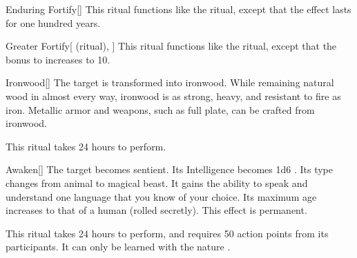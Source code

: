 \lowercase{\hypertarget{spell:Enduring Fortify}{}}\label{spell:Enduring Fortify}
\begin{apability}[\nth{3}]{\hypertarget{spell:Enduring Fortify}{Enduring Fortify}}[]
This ritual functions like the  ritual, except that the effect lasts for one hundred years.
\end{apability}
\vspace{0.25em}



\lowercase{\hypertarget{spell:Greater Fortify}{}}\label{spell:Greater Fortify}
\begin{attuneability}[\nth{3}]{\hypertarget{spell:Greater Fortify}{Greater Fortify}}[ (ritual), ]
This ritual functions like the  ritual, except that the bonus to  increases to 10.
\end{attuneability}
\vspace{0.25em}



\lowercase{\hypertarget{spell:Ironwood}{}}\label{spell:Ironwood}
\begin{apability}[\nth{3}]{\hypertarget{spell:Ironwood}{Ironwood}}[]
The target is transformed into ironwood.
While remaining natural wood in almost every way, ironwood is as strong, heavy, and resistant to fire as iron.
Metallic armor and weapons, such as full plate, can be crafted from ironwood.

This ritual takes 24 hours to perform.
\end{apability}
\vspace{0.25em}



\lowercase{\hypertarget{spell:Awaken}{}}\label{spell:Awaken}
\begin{apability}[\nth{5}]{\hypertarget{spell:Awaken}{Awaken}}[]
The target becomes sentient.
Its Intelligence becomes 1d6 .
Its type changes from animal to magical beast.
It gains the ability to speak and understand one language that you know of your choice.
Its maximum age increases to that of a human (rolled secretly).
This effect is permanent.

This ritual takes 24 hours to perform, and requires 50 action points from its participants.
It can only be learned with the nature .
\end{apability}
\vspace{0.25em}



